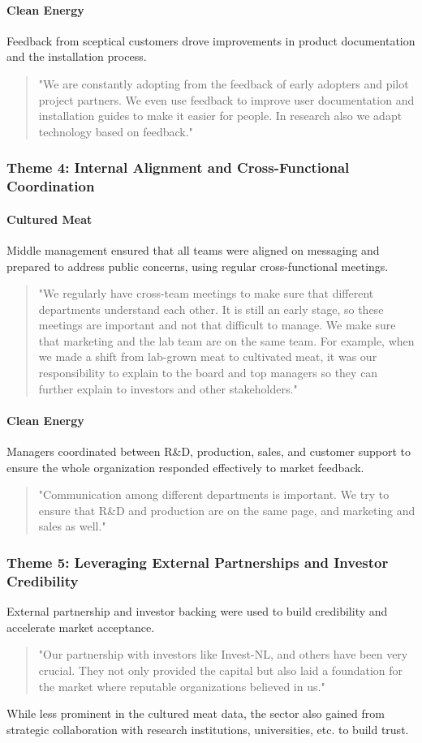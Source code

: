 \paragraph{Clean Energy}
Feedback from sceptical customers drove improvements in product documentation and the installation process.
\begin{quote}
	"We are constantly adopting from the feedback of early adopters and pilot project partners. We even use feedback to improve user documentation and installation guides to make it easier for people. In research also we adapt technology based on feedback."
\end{quote}

\subsubsection{Theme 4: Internal Alignment and Cross-Functional Coordination}
\paragraph{Cultured Meat}
Middle management ensured that all teams were aligned on messaging and prepared to address public concerns, using regular cross-functional meetings.
\begin{quote}
	"We regularly have cross-team meetings to make sure that different departments understand each other. It is still an early stage, so these meetings are important and not that difficult to manage. We make sure that marketing and the lab team are on the same team. For example, when we made a shift from lab-grown meat to cultivated meat, it was our responsibility to explain to the board and top managers so they can further explain to investors and other stakeholders."
\end{quote}

\paragraph{Clean Energy}
Managers coordinated between R\&D, production, sales, and customer support to ensure the whole organization responded effectively to market feedback.
\begin{quote}
	"Communication among different departments is important. We try to ensure that R\&D and production are on the same page, and marketing and sales as well."
\end{quote}

\subsubsection{Theme 5: Leveraging External Partnerships and Investor Credibility}
External partnership and investor backing were used to build credibility and accelerate market acceptance.
\begin{quote}
	"Our partnership with investors like Invest-NL, and others have been very crucial. They not only provided the capital but also laid a foundation for the market where reputable organizations believed in us."
\end{quote}
While less prominent in the cultured meat data, the sector also gained from strategic collaboration with research institutions, universities, etc. to build trust.

